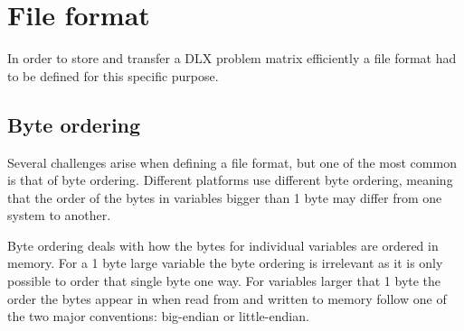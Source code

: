 










\section{File format}

In order to store and transfer a DLX problem matrix efficiently a file format had to be defined for this specific purpose.


\subsection{Byte ordering}

Several challenges arise when defining a file format, but one of the most common is that of byte ordering.
Different platforms use different byte ordering, meaning that the order of the bytes in variables bigger than 1 byte may differ from one system to another.

Byte ordering deals with how the bytes for individual variables are ordered in memory.
For a 1 byte large variable the byte ordering is irrelevant as it is only possible to order that single byte one way.
For variables larger that 1 byte the order the bytes appear in when read from and written to memory follow one of the two major conventions: big-endian or little-endian.

